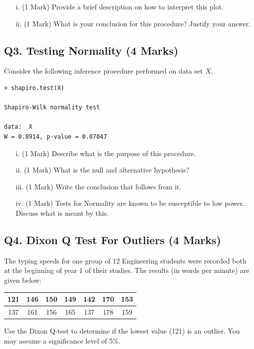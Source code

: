 \documentclass[a4paper,12pt]{article}
\begin{document}
\begin{itemize}
	\item[i.] (1 Mark) Provide a brief description on how to interpret this plot.
	\item[ii.] (1 Mark) What is your conclusion for this procedure? Justify your answer.
\end{itemize}

\subsection*{Q3. Testing Normality (4 Marks)} %
Consider the following inference procedure performed on data set $X$.
\begin{center}
	\begin{verbatim}
> shapiro.test(X)

Shapiro-Wilk normality test

data:  X
W = 0.8914, p-value = 0.07047

	\end{verbatim}
\end{center}


\begin{itemize}
	\item[i.] (1 Mark) Describe what is the purpose of this procedure.
	\item[ii.] (1 Mark) What is the null and alternative hypothesis?
	\item[iii.] (1 Mark) Write the conclusion that follows from it.
	\item[iv.] (1 Mark) Tests for Normality are known to be susceptible to low power. Discuss what is meant by this.
\end{itemize}


\subsection*{Q4. Dixon Q Test For Outliers (4 Marks)}

The typing speeds for one group of 12 Engineering students were recorded both at the beginning of year 1 of their studies. The results (in words per minute) are given below:

\begin{center}
\begin{tabular}{|c|c|c|c|c|c|c|}
\hline
121 & 146 & 150 &149 &142 &170& 153\\ \hline
 137 & 161 & 156& 165& 137& 178& 159
\\ \hline
\end{tabular}
\end{center}
Use the Dixon Q-test to determine if the lowest value (121) is an outlier. You may assume a significance level of 5\%.
\end{document}
